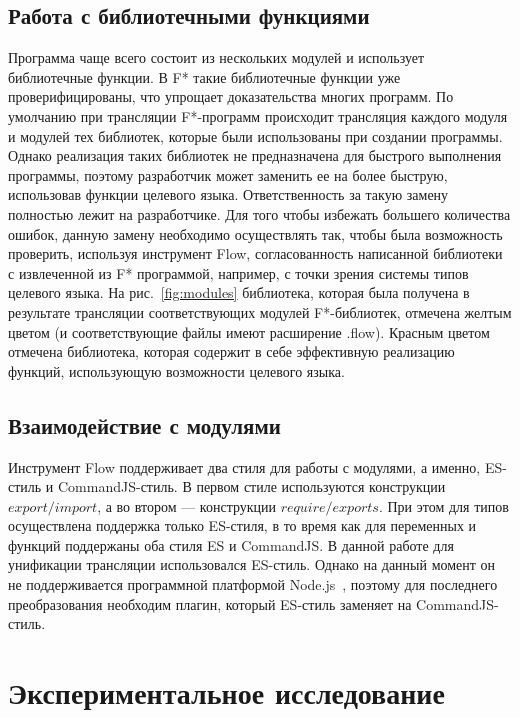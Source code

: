 \subsection{Работа с библиотечными функциями}

Программа чаще всего состоит из нескольких модулей и использует библиотечные функции. В F* такие библиотечные функции уже проверифицированы, что упрощает доказательства многих программ. По умолчанию при трансляции F*-программ происходит трансляция каждого модуля и модулей тех библиотек, которые были использованы при создании программы. Однако реализация таких библиотек не предназначена для быстрого выполнения программы, поэтому разработчик может заменить ее на более быструю, использовав функции целевого языка. Ответственность за такую замену полностью лежит на разработчике. Для того чтобы избежать большего количества ошибок, данную замену необходимо осуществлять так, чтобы была возможность проверить, используя инструмент Flow, согласованность написанной библиотеки с извлеченной из F* программой, например, с точки зрения системы типов целевого языка. На рис.~\ref{fig:modules} библиотека, которая была получена в результате трансляции соответствующих модулей F*-библиотек, отмечена желтым цветом (и соответствующие файлы имеют расширение .flow). Красным цветом отмечена библиотека, которая содержит в себе эффективную реализацию функций, использующую возможности целевого языка. 

\subsection{Взаимодействие с модулями}

Инструмент Flow поддерживает два стиля для работы с модулями, а именно, ES-стиль и CommandJS-стиль. В первом стиле используются конструкции  $export/import$, а во втором --- конструкции $require/exports$. При этом для типов осуществлена поддержка только ES-стиля, в то время как для переменных и функций поддержаны оба стиля ES и CommandJS. В данной работе для унификации трансляции использовался ES-стиль. Однако на данный момент он не поддерживается программной платформой Node.js~\cite{node_js}, поэтому для последнего преобразования необходим плагин, который ES-стиль заменяет на CommandJS-стиль.

\section{Экспериментальное исследование}


